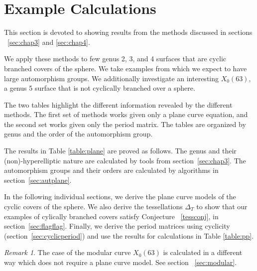 \documentclass[12pt,reqno]{amsart}
\theoremstyle{definition}
\theoremstyle{remark}
\newtheorem*{remark}{Remark}
\begin{document}

\section{Example Calculations}
\label{sec:examples}
This section is devoted to showing results from the methods discussed in sections ~\ref{sec:chap3} and \ref{sec:chap4}.

We apply these methods to few genus 2, 3, and 4 surfaces that are cyclic branched covers of the sphere. We take examples from \cite{dthesis} which we expect to have large automorphism groups. We additionally investigate an interesting $X_0(63),$ a genus 5 surface that is not cyclically branched over a sphere.

The two tables highlight the different information revealed by the different methods. The first set of methods works given only a plane curve equation, and the second set works given only the period matrix. The tables are organized by genus and the order of the automorphism group. 





The results in Table \ref{table:plane} are proved as follows. The genus and their (non)-hyperelliptic nature are calculated by tools from section~\ref{sec:chap3}. The automorphism groups and their orders are calculated by algorithms in section~\ref{sec:autplane}.

In the following individual sections, we derive the plane curve models of the cyclic covers of the sphere. We also derive the tessellations $\Delta_T$ to show that our examples of cylically branched covers satisfy Conjecture ~\ref{tessconj}, in section~\ref{sec:flagflag}. Finally, we derive the period matrices using cyclicity (section~\ref{sec:cyclicperiod}) and use the results for calculations in Table \ref{table:pp}. 


\begin{remark} The case of the modular curve $X_0(63)$ is calculated in a different way which does not require a plane curve model. See section ~\ref{sec:modular}. \end{remark}
\end{document}
